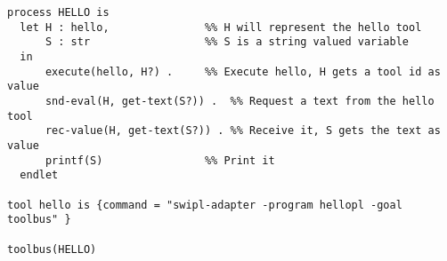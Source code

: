 \small
\begin{verbatim}
process HELLO is
  let H : hello,               %% H will represent the hello tool
      S : str                  %% S is a string valued variable
  in
      execute(hello, H?) .     %% Execute hello, H gets a tool id as value
      snd-eval(H, get-text(S?)) .  %% Request a text from the hello tool
      rec-value(H, get-text(S?)) . %% Receive it, S gets the text as value
      printf(S)                %% Print it    
  endlet

tool hello is {command = "swipl-adapter -program hellopl -goal toolbus" }

toolbus(HELLO)
\end{verbatim}
\normalsize
